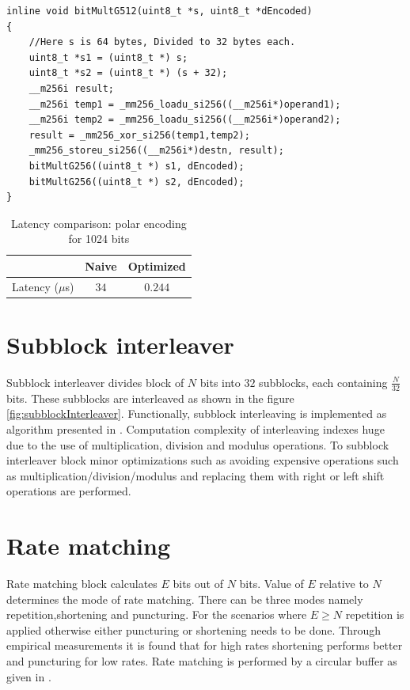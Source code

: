 \begin{verbatim}
inline void bitMultG512(uint8_t *s, uint8_t *dEncoded) 
{
	//Here s is 64 bytes, Divided to 32 bytes each.
	uint8_t *s1 = (uint8_t *) s;
	uint8_t *s2 = (uint8_t *) (s + 32);
	__m256i result;
	__m256i temp1 = _mm256_loadu_si256((__m256i*)operand1);
	__m256i temp2 = _mm256_loadu_si256((__m256i*)operand2);
	result = _mm256_xor_si256(temp1,temp2);
	_mm256_storeu_si256((__m256i*)destn, result);
	bitMultG256((uint8_t *) s1, dEncoded);
	bitMultG256((uint8_t *) s2, dEncoded);
}
\end{verbatim}

\begin{table}[!h]
	\begin{center}
		\caption{Latency comparison: polar encoding for 1024 bits}
		\label{tab:polarEncoder}
		\begin{tabular}{c|c|c} %
			\textbf{ } & Naive & Optimized \\
			\hline
			Latency ($\mu$s) & $34$ & $0.244$\\
		\end{tabular}
	\end{center}
\end{table}


\section{Subblock interleaver}
Subblock interleaver divides block of $N$ bits into $32$ subblocks, each containing $\frac{N}{32}$ bits. These subblocks are interleaved as shown in the figure \ref{fig:subblockInterleaver}. Functionally, subblock interleaving is implemented as algorithm presented in \cite{3gpp.38.212}. Computation complexity of interleaving indexes huge due to the use of multiplication, division and modulus operations. To subblock interleaver block minor optimizations such as avoiding expensive operations such as multiplication/division/modulus and replacing them with right or left shift operations are performed.

\section{Rate matching}
Rate matching block calculates $E$ bits out of $N$ bits. Value of $E$ relative to $N$ determines the mode of rate matching. There can be three modes namely repetition,shortening and puncturing. For the scenarios where $E \geq N$ repetition is applied otherwise either puncturing or shortening needs to be done. Through empirical measurements it is found that for high rates shortening performs better and puncturing for low rates. Rate matching is performed by a circular buffer as given in \cite{DesignOfPolarCodes5G}.\newline

